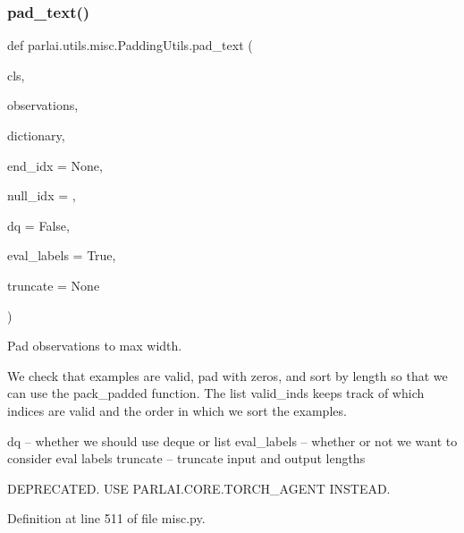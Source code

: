 \mbox{\label{classparlai_1_1utils_1_1misc_1_1PaddingUtils_acd7178452139c55dc56e9889b10347cc}} 
\subsubsection{\texorpdfstring{pad\+\_\+text()}{pad\_text()}}
{\footnotesize\ttfamily def parlai.\+utils.\+misc.\+Padding\+Utils.\+pad\+\_\+text (\begin{DoxyParamCaption}\item[{}]{cls,  }\item[{}]{observations,  }\item[{}]{dictionary,  }\item[{}]{end\+\_\+idx = {\ttfamily None},  }\item[{}]{null\+\_\+idx = {},  }\item[{}]{dq = {\ttfamily False},  }\item[{}]{eval\+\_\+labels = {\ttfamily True},  }\item[{}]{truncate = {\ttfamily None} }\end{DoxyParamCaption})}

\begin{DoxyVerb}Pad observations to max width.

We check that examples are valid, pad with zeros, and sort by length
so that we can use the pack_padded function. The list valid_inds
keeps track of which indices are valid and the order in which we sort
the examples.

dq -- whether we should use deque or list
eval_labels -- whether or not we want to consider eval labels
truncate -- truncate input and output lengths

DEPRECATED. USE PARLAI.CORE.TORCH_AGENT INSTEAD.
\end{DoxyVerb}
 

Definition at line 511 of file misc.\+py.


